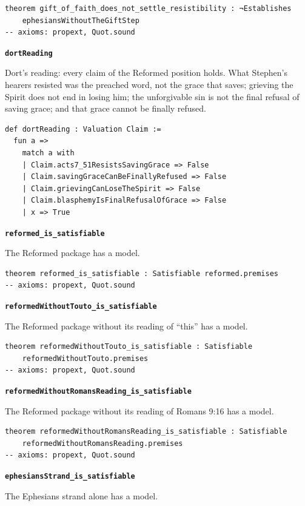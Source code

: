 \documentclass[11pt]{article}
\begin{document}
{\small\begin{verbatim}
theorem gift_of_faith_does_not_settle_resistibility : ¬Establishes
    ephesiansWithoutTheGiftStep
-- axioms: propext, Quot.sound
\end{verbatim}}
\par\medskip\noindent\textbf{\texttt{dort\allowbreak{}Reading}}\par\nobreak\noindent
Dort’s reading: every claim of the Reformed position holds. What Stephen’s hearers resisted was the preached word, not the grace that saves; grieving the Spirit does not end in losing him; the unforgivable sin is not the final refusal of saving grace; and that grace cannot be finally refused.

{\small\begin{verbatim}
def dortReading : Valuation Claim :=
  fun a =>
    match a with
    | Claim.acts7_51ResistsSavingGrace => False
    | Claim.savingGraceCanBeFinallyRefused => False
    | Claim.grievingCanLoseTheSpirit => False
    | Claim.blasphemyIsFinalRefusalOfGrace => False
    | x => True
\end{verbatim}}
\par\medskip\noindent\textbf{\texttt{reformed\_\allowbreak{}is\_\allowbreak{}satisfiable}}\par\nobreak\noindent
The Reformed package has a model.

{\small\begin{verbatim}
theorem reformed_is_satisfiable : Satisfiable reformed.premises
-- axioms: propext, Quot.sound
\end{verbatim}}
\par\medskip\noindent\textbf{\texttt{reformed\allowbreak{}Without\allowbreak{}Touto\_\allowbreak{}is\_\allowbreak{}satisfiable}}\par\nobreak\noindent
The Reformed package without its reading of “this” has a model.

{\small\begin{verbatim}
theorem reformedWithoutTouto_is_satisfiable : Satisfiable
    reformedWithoutTouto.premises
-- axioms: propext, Quot.sound
\end{verbatim}}
\par\medskip\noindent\textbf{\texttt{reformed\allowbreak{}Without\allowbreak{}Romans\allowbreak{}Reading\_\allowbreak{}is\_\allowbreak{}satisfiable}}\par\nobreak\noindent
The Reformed package without its reading of Romans 9:16 has a model.

{\small\begin{verbatim}
theorem reformedWithoutRomansReading_is_satisfiable : Satisfiable
    reformedWithoutRomansReading.premises
-- axioms: propext, Quot.sound
\end{verbatim}}
\par\medskip\noindent\textbf{\texttt{ephesians\allowbreak{}Strand\_\allowbreak{}is\_\allowbreak{}satisfiable}}\par\nobreak\noindent
The Ephesians strand alone has a model.
\end{document}
